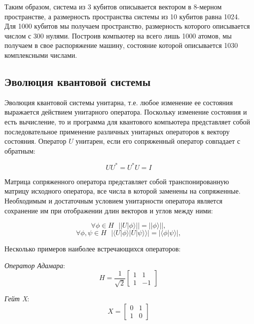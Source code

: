 \documentclass[14pt]{article}
\begin{document}
	Таким образом, система из 3 кубитов описывается вектором в 8-мерном пространстве, а размерность пространства системы из 10 кубитов равна 1024. Для 1000 кубитов мы получаем пространство, размерность которого описывается числом с 300 нулями.
Построив компьютер на всего лишь 1000 атомов, мы получаем в свое распоряжение машину, состояние которой описывается 1030 комплексными числами.
	
	\newpage
	\subsection{Эволюция квантовой системы}
	
	Эволюция квантовой системы унитарна, т.е. любое изменение
ее состояния выражается действием унитарного оператора. Поскольку изменение состояния и есть вычисление, то и программа для квантового компьютера представляет собой последовательное применение различных унитарных операторов к вектору состояния.
Оператор $U$ унитарен, если его сопряженный оператор совпадает с обратным:

	\begin{equation}
	UU^* = U^*U = I
	\end{equation}
	
	Матрица сопряженного оператора представляет собой
транспонированную матрицу исходного оператора, все числа
в которой заменены на сопряженные.
Необходимым и достаточным условием унитарности оператора является сохранение им при отображении длин векторов и углов между ними:

	\begin{equation}
	\forall \phi \in H \text{    } || U|\phi \rangle || = || \phi \rangle ||,
	\end{equation}
	\begin{equation}
	\forall \phi, \psi \in H \text{    } | \langle U|\phi \rangle | U|\psi \rangle \rangle | = | \langle \phi | \psi \rangle |,
	\end{equation}
	
	Несколько примеров наиболее встречающихся операторов:
	
	\textit{Оператор Адамара}:
	\begin{equation}
	H = \frac{1}{\sqrt{2}} \begin{bmatrix} 1 & 1 \\ 1 & -1 \end{bmatrix}
	\end{equation}

	\textit{Гейт X}:
	\begin{equation}
	X = \begin{bmatrix} 0 & 1 \\ 1 & 0 \end{bmatrix}
	\end{equation}	
	
\end{document}

